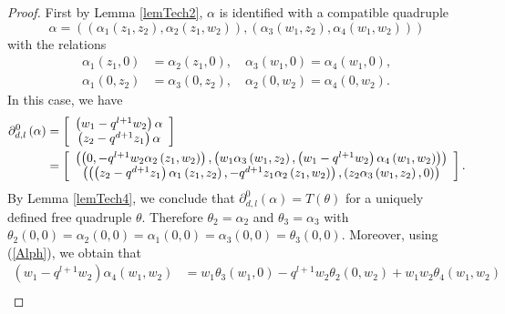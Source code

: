 \documentclass[12pt,reqno]{amsart}%
\theoremstyle{plain}
\numberwithin{theorem}{section} \numberwithin{equation}{section}
\numberwithin{lemma}{section}
\numberwithin{remark}{section}
\numberwithin{example}{section}
\numberwithin{proposition}{section}
\numberwithin{definition}{section}
\numberwithin{corollary}{section}
\begin{document}
\begin{proof}
First by Lemma \ref{lemTech2}, $\alpha$ is identified with a compatible
quadruple
\[
\alpha=\left(  \left(  \alpha_{1}\left(  z_{1},z_{2}\right)  ,\alpha
_{2}\left(  z_{1},w_{2}\right)  \right)  ,\left(  \alpha_{3}\left(
w_{1},z_{2}\right)  ,\alpha_{4}\left(  w_{1},w_{2}\right)  \right)  \right)
\]
with the relations
\begin{align}
\alpha_{1}\left(  z_{1},0\right)   &  =\alpha_{2}\left(  z_{1},0\right)
,\quad\alpha_{3}\left(  w_{1},0\right)  =\alpha_{4}\left(  w_{1},0\right)
,\label{Alph}\\
\alpha_{1}\left(  0,z_{2}\right)   &  =\alpha_{3}\left(  0,z_{2}\right)
,\quad\alpha_{2}\left(  0,w_{2}\right)  =\alpha_{4}\left(  0,w_{2}\right)
.\nonumber
\end{align}
In this case, we have
\begin{align*}
\partial_{d,l}^{0}\left(  \alpha\right)   &  =\left[
\begin{array}
[c]{c}%
\left(  w_{1}-q^{l+1}w_{2}\right)  \alpha\\
\left(  z_{2}-q^{d+1}z_{1}\right)  \alpha
\end{array}
\right] \\
&  =\left[
\begin{array}
[c]{c}%
\left(  \left(  0,-q^{l+1}w_{2}\alpha_{2}\left(  z_{1},w_{2}\right)  \right)
,\left(  w_{1}\alpha_{3}\left(  w_{1},z_{2}\right)  ,\left(  w_{1}%
-q^{l+1}w_{2}\right)  \alpha_{4}\left(  w_{1},w_{2}\right)  \right)  \right)
\\
\left(  \left(  \left(  z_{2}-q^{d+1}z_{1}\right)  \alpha_{1}\left(
z_{1},z_{2}\right)  ,-q^{d+1}z_{1}\alpha_{2}\left(  z_{1},w_{2}\right)
\right)  ,\left(  z_{2}\alpha_{3}\left(  w_{1},z_{2}\right)  ,0\right)
\right)
\end{array}
\right]  .
\end{align*}
By Lemma \ref{lemTech4}, we conclude that $\partial_{d,l}^{0}\left(
\alpha\right)  =T\left(  \theta\right)  $ for a uniquely defined free
quadruple $\theta$. Therefore $\theta_{2}=\alpha_{2}$ and $\theta_{3}%
=\alpha_{3}$ with $\theta_{2}\left(  0,0\right)  =\alpha_{2}\left(
0,0\right)  =\alpha_{1}\left(  0,0\right)  =\alpha_{3}\left(  0,0\right)
=\theta_{3}\left(  0,0\right)  $. Moreover, using (\ref{Alph}), we obtain
that
\begin{align*}
\left(  w_{1}-q^{l+1}w_{2}\right)  \alpha_{4}\left(  w_{1},w_{2}\right)   &
=w_{1}\theta_{3}\left(  w_{1},0\right)  -q^{l+1}w_{2}\theta_{2}\left(
0,w_{2}\right)  +w_{1}w_{2}\theta_{4}\left(  w_{1},w_{2}\right) \\

\end{align*}
\end{proof}
\end{document}
